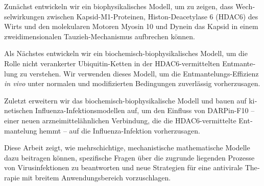 \begin{otherlanguage}{ngerman}
Zunächst entwickeln wir ein biophysikalisches Modell, um zu zeigen, dass Wechselwirkungen zwischen Kapsid-M1-Proteinen, Histon-Deacetylase 6 (HDAC6) des Wirts und den molekularen Motoren Myosin 10 und Dynein das Kapsid in einem zweidimensionalen Tauzieh-Mechanismus aufbrechen können.  

Als Nächstes entwickeln wir ein biochemisch-biophysikalisches Modell, um die Rolle nicht verankerter Ubiquitin-Ketten in der HDAC6-vermittelten Entmantelung zu verstehen. Wir verwenden dieses Modell, um die Entmantelungs-Effizienz \textit{in vivo} unter normalen und modifizierten Bedingungen zuverlässig vorherzusagen.

Zuletzt erweitern wir das biochemisch-biophysikalische Modell und bauen auf kinetischen Influenza-Infektionsmodellen auf, um den Einfluss von DARPin-F10 – einer neuen arzneimittelähnlichen Verbindung, die die HDAC6-vermittelte Entmantelung hemmt – auf die Influenza-Infektion vorherzusagen. 

Diese Arbeit zeigt, wie mehrschichtige, mechanistische mathematische Modelle dazu beitragen können, spezifische Fragen über die zugrunde liegenden Prozesse von Virusinfektionen zu beantworten und neue Strategien für eine antivirale Therapie mit breitem Anwendungsbereich vorzuschlagen.

\end{otherlanguage}

\endgroup

\cleardoublepage%

\begingroup
\let\clearpage\relax
\let\cleardoublepage\relax
\let\cleardoublepage\relax

